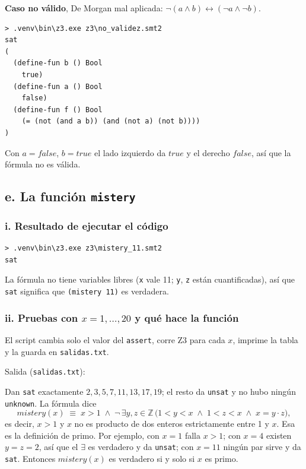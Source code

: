 \documentclass[11pt,letterpaper]{article}
\begin{document}
\textbf{Caso no válido}, De Morgan mal aplicada: $\neg(a \wedge b) \leftrightarrow (\neg a \wedge \neg b)$.

\begin{lstlisting}
> .venv\bin\z3.exe z3\no_validez.smt2
sat
(
  (define-fun b () Bool
    true)
  (define-fun a () Bool
    false)
  (define-fun f () Bool
    (= (not (and a b)) (and (not a) (not b))))
)
\end{lstlisting}
Con $a = \mathit{false}$, $b = \mathit{true}$ el lado izquierdo da $\mathit{true}$ y el derecho $\mathit{false}$, así que la fórmula no es válida.

\subsection*{e. La función \texttt{mistery}}

\subsubsection*{i. Resultado de ejecutar el código}


\begin{lstlisting}
> .venv\bin\z3.exe z3\mistery_11.smt2
sat
\end{lstlisting}
La fórmula no tiene variables libres (\texttt{x} vale 11; \texttt{y}, \texttt{z} están cuantificadas), así que \texttt{sat} significa que \texttt{(mistery 11)} es verdadera.

\subsubsection*{ii. Pruebas con $x = 1, \dots, 20$ y qué hace la función}

El script cambia solo el valor del \texttt{assert}, corre Z3 para cada $x$, imprime la tabla y la guarda en \texttt{salidas.txt}.

Salida (\texttt{salidas.txt}):


Dan \texttt{sat} exactamente $2, 3, 5, 7, 11, 13, 17, 19$; el resto da \texttt{unsat} y no hubo ningún \texttt{unknown}. La fórmula dice
\[
\mathit{mistery}(x) \;\equiv\; x > 1 \;\wedge\; \neg\,\exists y, z \in \mathbb{Z}\,\bigl(1 < y < x \;\wedge\; 1 < z < x \;\wedge\; x = y \cdot z\bigr),
\]
es decir, $x > 1$ y $x$ no es producto de dos enteros estrictamente entre 1 y $x$. Esa es la definición de primo. Por ejemplo, con $x = 1$ falla $x > 1$; con $x = 4$ existen $y = z = 2$, así que el $\exists$ es verdadero y da \texttt{unsat}; con $x = 11$ ningún par sirve y da \texttt{sat}. Entonces $\mathit{mistery}(x)$ es verdadero si y solo si $x$ es primo.
\end{document}
